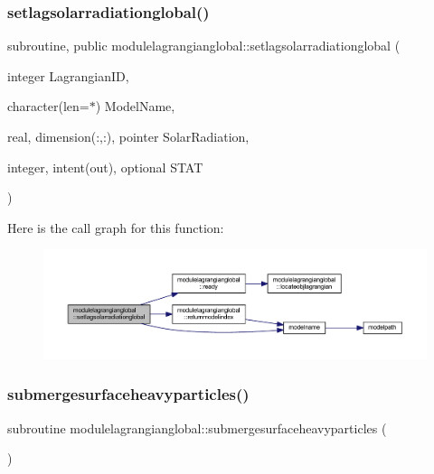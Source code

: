 \subsubsection{\texorpdfstring{setlagsolarradiationglobal()}{setlagsolarradiationglobal()}}
{\footnotesize\ttfamily subroutine, public modulelagrangianglobal\+::setlagsolarradiationglobal (\begin{DoxyParamCaption}\item[{integer}]{Lagrangian\+ID,  }\item[{character(len=$\ast$)}]{Model\+Name,  }\item[{real, dimension(\+:,\+:), pointer}]{Solar\+Radiation,  }\item[{integer, intent(out), optional}]{S\+T\+AT }\end{DoxyParamCaption})}

Here is the call graph for this function\+:\nopagebreak
\begin{figure}[H]
\begin{center}
\leavevmode
\includegraphics[width=350pt]{namespacemodulelagrangianglobal_a7a50386c8ebd93860ae227d772932cd8_cgraph}
\end{center}
\end{figure}
\mbox{\label{namespacemodulelagrangianglobal_ac3b09a7520aad0e3fd4d4778451773cc}} 
\subsubsection{\texorpdfstring{submergesurfaceheavyparticles()}{submergesurfaceheavyparticles()}}
{\footnotesize\ttfamily subroutine modulelagrangianglobal\+::submergesurfaceheavyparticles (\begin{DoxyParamCaption}{ }\end{DoxyParamCaption})\hspace{0.3cm}{\ttfamily [private]}}


